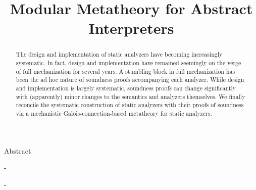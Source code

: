 \documentclass[pldi]{sigplanconf}
\begin{document}
\title{Modular Metatheory for Abstract Interpreters}
\maketitle

Abstract {-{
\begin{abstract}

The design and implementation of static analyzers have becoming increasingly systematic.
In fact, design and implementation have remained seemingly on the verge of full mechanization for several years.
A stumbling block in full mechanization has been the ad hoc nature of soundness proofs accompanying each analyzer.
While design and implementation is largely systematic, 
  soundness proofs can change significantly with (apparently) minor changes to the semantics and analyzers themselves.
We finally reconcile the systematic construction of static analyzers with their proofs of soundness 
  via a mechanistic Galois-connection-based metatheory for static analyzers.

\end{abstract}
}-}


\end{document}
